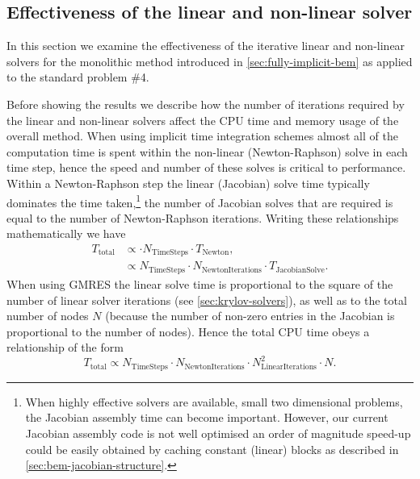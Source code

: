 \subsection{Effectiveness of the linear and non-linear solver}
\label{sec:effect-line-non}

In this section we examine the effectiveness of the iterative linear and non-linear solvers for the monolithic method introduced in \cref{sec:fully-implicit-bem} as applied to the \mumag standard problem \#4.

\label{mem-cpu-solver-correction}
Before showing the results we describe how the number of iterations required by the linear and non-linear solvers affect the CPU time and memory usage of the overall method.
When using implicit time integration schemes almost all of the computation time is spent within the non-linear (\ie Newton-Raphson) solve in each time step, hence the speed and number of these solves is critical to performance.
Within a Newton-Raphson step the linear (Jacobian) solve time typically dominates the time taken,\footnote{When highly effective solvers are available, \ie small two dimensional problems, the Jacobian assembly time can become important.
However, our current Jacobian assembly code is not well optimised \eg an order of magnitude speed-up could be easily obtained by caching constant (linear) blocks as described in \cref{sec:bem-jacobian-structure}.}
the number of Jacobian solves that are required is equal to the number of Newton-Raphson iterations.
Writing these relationships mathematically we have
\begin{equation}
  \begin{aligned}
    T_\mathrm{total} &\propto \cdot N_\mathrm{TimeSteps} \cdot T_\mathrm{Newton}, \\
                     &\propto N_\mathrm{TimeSteps} \cdot N_\mathrm{NewtonIterations} \cdot T_\mathrm{JacobianSolve}.
  \end{aligned}
\end{equation}
When using GMRES the linear solve time is proportional to the square of the number of linear solver iterations (see \cref{sec:krylov-solvers}), as well as to the total number of nodes $N$ (because the number of non-zero entries in the Jacobian is proportional to the number of nodes).
Hence the total CPU time obeys a relationship of the form
\begin{equation}
  T_\mathrm{total} \propto N_\mathrm{TimeSteps} \cdot N_\mathrm{NewtonIterations} \cdot N_\mathrm{LinearIterations}^2 \cdot N.
\end{equation}

